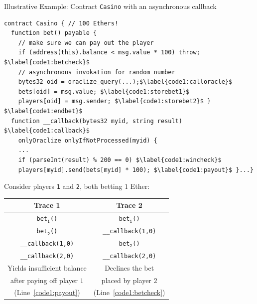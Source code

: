 \documentclass[9pt]{beamer}
\begin{document}
\begin{frame}[fragile]{Illustrative Example: Contract \texttt{Casino} with an asynchronous callback}
\begin{lstlisting}[mathescape=true,language=Solidity,basicstyle=\footnotesize\ttfamily]
contract Casino { // 100 Ethers!
  function bet() payable {
    // make sure we can pay out the player
    if (address(this).balance < msg.value * 100) throw; $\label{code1:betcheck}$
    // asynchronous invokation for random number
    bytes32 oid = oraclize_query(...);$\label{code1:calloracle}$
    bets[oid] = msg.value; $\label{code1:storebet1}$
    players[oid] = msg.sender; $\label{code1:storebet2}$ } $\label{code1:endbet}$
  function __callback(bytes32 myid, string result) $\label{code1:callback}$
    onlyOraclize onlyIfNotProcessed(myid) {
    ...
    if (parseInt(result) % 200 == 0) $\label{code1:wincheck}$
    players[myid].send(bets[myid] * 100); $\label{code1:payout}$ }...}
\end{lstlisting}
  \smallskip
  Consider players \texttt{1} and \texttt{2}, both betting $1$ Ether:
  \pause\smallskip
  \begin{center}\small
  \begin{tabular}{cc}
      \textbf{Trace 1}
    & \textbf{Trace 2}\\\hline\hline
      \texttt{bet}$_{\texttt{1}}$\texttt{()}
    & \texttt{bet}$_{\texttt{1}}$\texttt{()}\\
      \texttt{bet}$_{\texttt{2}}$\texttt{()}
    & \texttt{\_\_callback}\texttt{(1,0)}\\
      \texttt{\_\_callback}\texttt{(1,0)}
    & \texttt{bet}$_{\texttt{2}}$\texttt{()}\\
      \texttt{\_\_callback}\texttt{(2,0)}
    & \texttt{\_\_callback}\texttt{(2,0)}\\\hline\hline
    \pause
      Yields insufficient balance
    & Declines the bet\\[-.5mm]
      after paying off player $1$
    & placed by player $2$\\[-.5mm]
      (Line~\ref{code1:payout})
    & (Line~\ref{code1:betcheck})
  \end{tabular}
  \end{center}
\end{frame}
%
\end{document}
